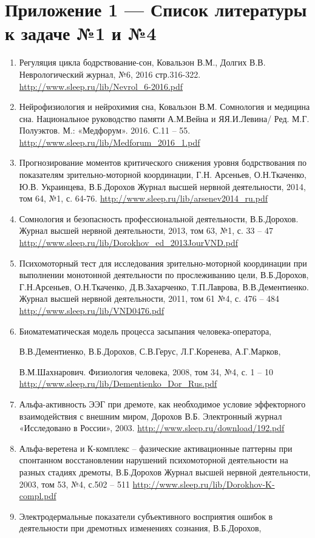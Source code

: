 \section*{Приложение 1 — Список литературы к задаче №1 и №4}

\begin{enumerate}
    \item Регуляция цикла бодрствование-сон, Ковальзон В.М., Долгих В.В. Неврологический журнал, №6, 2016 стр.316-322. 
    \url{http://www.sleep.ru/lib/Nevrol_6-2016.pdf}
    \item Нейрофизиология и нейрохимия сна, Ковальзон В.М. Сомнология и медицина сна. Национальное руководство памяти А.М.Вейна и ЯЯ.И.Левина/ Ред. М.Г. Полуэктов. М.: «Медфорум». 2016. С.11 – 55. 
    \url{http://www.sleep.ru/lib/Medforum_2016_1.pdf}
    \item Прогнозирование моментов критического снижения уровня бодрствования по показателям зрительно-моторной координации, Г.Н. Арсеньев, О.Н.Ткаченко, Ю.В. Украинцева, В.Б.Дорохов
    Журнал высшей нервной деятельности, 2014, том 64, №1, с. 64-76. 
    \url{http://www.sleep.ru/lib/arsenev2014_ru.pdf}
    \item Сомнология и безопасность профессиональной деятельности, В.Б.Дорохов. 
    Журнал высшей нервной деятельности, 2013, том 63, №1, с. 33 – 47
    \url{http://www.sleep.ru/lib/Dorokhov_ed_2013JourVND.pdf}
    \item Психомоторный тест для исследования зрительно-моторной координации при выполнении монотонной деятельности по прослеживанию цели, В.Б.Дорохов, Г.Н.Арсеньев, О.Н.Ткаченко, Д.В.Захарченко, Т.П.Лаврова, В.В.Дементиенко. 
    Журнал высшей нервной деятельности, 2011, том 61 №4, с. 476 – 484
    \url{http://www.sleep.ru/lib/VND0476.pdf}
    \item Биоматематическая модель процесса засыпания человека-оператора, 
    
    В.В.Дементиенко, В.Б.Дорохов, С.В.Герус, Л.Г.Коренева, А.Г.Марков, 
    
    В.М.Шахнарович. Физиология человека, 2008, том 34, №4, с. 1 – 10
    \url{http://www.sleep.ru/lib/Dementienko_Dor_Rus.pdf}
    \item Альфа-активность ЭЭГ при дремоте, как необходимое условие эффекторного взаимодействия с внешним миром, Дорохов В.Б. Электронный журнал «Исследовано в России», 2003.
    \url{http://www.sleep.ru/download/192.pdf}
    \item Альфа-веретена и К-комплекс – фазические активационные паттерны при спонтанном восстановлении нарушений психомоторной деятельности на разных стадиях дремоты, В.Б.Дорохов
    Журнал высшей нервной деятельности, 2003, том 53, №4, с.502 – 511
    \url{http://www.sleep.ru/lib/Dorokhov-K-compl.pdf}
    \item Электродермальные показатели субъективного восприятия ошибок в деятельности при дремотных изменениях сознания, В.Б.Дорохов, 
    

\end{enumerate}
